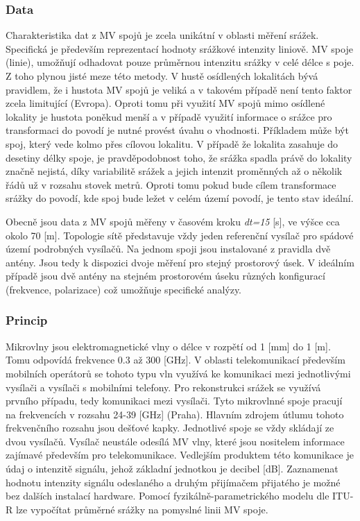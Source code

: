 \documentclass[a4paper,12pt,oneside]{report}
\begin{document}
\subsubsection{Data}
Charakteristika dat z MV spojů je zcela unikátní v oblasti měření srážek. Specifická je především reprezentací hodnoty srážkové intenzity liniově. MV spoje (linie), umožňují odhadovat pouze průměrnou intenzitu srážky v celé délce s poje. Z toho plynou jisté meze této metody. V hustě osídlených lokalitách bývá pravidlem, že i hustota MV spojů je veliká a v takovém případě není tento faktor zcela limitující (Evropa). Oproti tomu při využití MV spojů mimo osídlené lokality je hustota poněkud menší a v případě využití informace o srážce pro transformaci do povodí je nutné provést úvahu o vhodnosti.  Příkladem může být spoj, který vede kolmo přes cílovou lokalitu. V případě že lokalita zasahuje do desetiny délky spoje, je pravděpodobnost toho, že srážka spadla právě do lokality značně nejistá, díky variabilitě srážek a jejich intenzit proměnných až o několik řádů už v rozsahu stovek metrů. 
Oproti tomu pokud bude cílem transformace srážky do povodí, kde spoj bude ležet v celém území povodí, je tento stav ideální. 

Obecně jsou data z MV spojů měřeny v časovém kroku \emph{dt=15} [s], ve výšce cca okolo 70 [m]. Topologie sítě představuje vždy jeden referenční vysílač pro spádové území podrobných vysílačů. Na jednom spoji jsou instalované z pravidla dvě antény. Jsou tedy k dispozici dvoje měření pro stejný prostorový úsek. V ideálním případě jsou dvě antény na stejném prostorovém úseku různých konfigurací (frekvence, polarizace) což umožňuje specifické analýzy.

    
\subsubsection{Princip}
Mikrovlny jsou elektromagnetické vlny o délce v rozpětí od 1 [mm] do 1 [m]. Tomu odpovídá frekvence 0.3  až 300 [GHz]. V oblasti telekomunikací především mobilních operátorů se tohoto typu vln využívá ke komunikaci mezi jednotlivými vysílači a vysílači s mobilními telefony. Pro rekonstrukci srážek se využívá prvního případu, tedy komunikaci mezi vysílači. Tyto mikrovlnné spoje pracují na frekvencích v rozsahu 24-39 [GHz] (Praha). Hlavním zdrojem útlumu tohoto frekvenčního rozsahu jsou dešťové kapky. Jednotlivé spoje se vždy skládají ze dvou vysílačů. Vysílač neustále odesílá MV vlny, které jsou nositelem informace zajímavé především pro telekomunikace. Vedlejším produktem této komunikace je údaj o intenzitě signálu, jehož základní jednotkou je decibel [dB]. Zaznamenat hodnotu intenzity signálu odeslaného a druhým přijímačem přijatého je možné bez dalších instalací hardware. Pomocí fyzikálně-parametrického modelu dle ITU-R\cite{itu} lze vypočítat průměrné srážky na pomyslné linii MV spoje.
\end{document}
